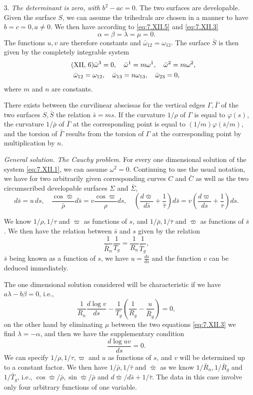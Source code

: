 \documentclass[leqno,11pt]{book}
\numberwithin{equation}{chapter}
\theoremstyle{shape1}
\theoremstyle{shape0}
\theoremstyle{shape2}
\theoremstyle{definition}
\begin{document}
3. \emph{The determinant is zero, with $b^{2}-ac=0$}. The two surfaces are developable. Given the surface $S$, we can assume the trihedrals are chosen in a manner to have $b=c=0,a\neq 0$. We then have according to \eqref{eq:7.XII.5} and \eqref{eq:7.XII.3}
\[
\alpha=\beta=\lambda=\mu=0.
\]
The functions $u,v$ are therefore constants and $\bar\omega_{12}=\omega_{12}$. The surface $\bar S$ is then given by the completely integrable system
\begin{gather}
  \label{eq:7.XII.6}\tag{XII, 6}
  \bar\omega^{3}=0,\quad\bar\omega^{1}=m\omega^{1},\quad\bar\omega^{2}=m\omega^{2},\\
  \bar\omega_{12}=\omega_{12},\quad\bar\omega_{13}=n\omega_{13},\quad\bar\omega_{23}=0,\notag
\end{gather}
where $m$ and $n$ are constants.

There exists between the curvilinear abscissas for the vertical edges $\Gamma,\bar\Gamma$ of the two surfaces $S, \bar S$ the relation $\bar s=ms$. If the curvature $1/\rho$ of $\Gamma$ is equal to $\varphi(s)$, the curvature $1/\bar\rho$ of $\bar\Gamma$ at the corresponding point is equal to $(1/m)\varphi(\bar s/m)$, and the torsion of $\bar\Gamma$ results from the torsion of $\Gamma$ at the corresponding point by multiplication by $n$.

\vspace{12pt}\fsec\emph{General solution. The Cauchy problem.} For every one dimensional solution of the system \eqref{eq:7.XII.1}, we can assume $\omega^{2}=0$. Continuing to use the usual notation, we have for two arbitrarily given corresponding curves $C$ and $\bar C$ as well as the two circumscribed developable surfaces $\Sigma$ and $\bar\Sigma$,
\[
d\bar s=u\,ds,\quad\frac{\cos\bar\varpi}{\bar\rho}d\bar s=v\frac{\cos\varpi}{\rho}ds,\quad\left(\frac{d\bar\varpi}{d\bar s}+\frac{1}{\bar\tau}\right)d\bar s=v\left(\frac{d\varpi}{ds}+\frac{1}{\tau}\right)ds.
\]

We know $1/\rho,1/\tau$ and $\varpi$ as functions of $s$, and $1/\bar\rho,1/\bar\tau$ and $\bar\varpi$ as functions of $\bar s$. We then have the relation between $\bar s$ and $s$ given by the relation
\[
\frac{1}{\bar R_{n}}\frac{1}{T_{g}}=\frac{1}{R_{n}}\frac{1}{\bar T_{g}},
\]
$\bar s$ being known as a function of $s$, we have $u=\frac{d\bar s}{ds}$ and the function $v$ can be deduced immediately.

The one dimensional solution considered will be characteristic if we have $a\lambda-b\beta=0$, i.e.,
\[
\frac{1}{R_{n}}\frac{d\log v}{ds}-\frac{1}{T_{g}}\left(\frac{1}{R_{g}}-\frac{u}{\bar R_{g}}\right)=0,
\]
on the other hand by eliminating $\mu$ between the two equations \eqref{eq:7.XII.3} we find $\lambda=-\alpha$, and then we have the supplementary condition
\[
\frac{d\log uv}{ds}=0.
\]
We can specify $1/\rho,1/\tau,\varpi$ and $u$ as functions of $s$, and $v$ will be determined up to a constant factor. We then have $1/\bar\rho,1/\bar\tau$ and $\bar\varpi$ as we know $1/\bar R_{n},1/\bar R_{g}$ and $1/\bar T_{g}$, i.e., $\cos\bar\varpi/\bar\rho,\sin\bar\varpi/\bar\rho$ and $d\bar\varpi/d\bar s+1/\bar\tau$. The data in this case involve only four arbitrary functions of one variable.
\end{document}
